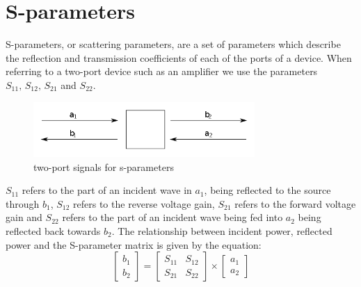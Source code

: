 

\section{S-parameters}

S-parameters, or scattering parameters, are a set of parameters which describe the reflection and transmission coefficients of each of the ports of a device. When referring to a two-port device such as an amplifier we use the parameters $S_{11},\, S_{12},\, S_{21}$ and $S_{22}$.

\begin{figure}[h]
	  \centering
	  \includegraphics[width=0.75\textwidth]{img/S_parameter_image}
	  \caption{two-port signals for s-parameters}
	  \label{fig:fig_sparam_vis}
\end{figure}

 $S_{11}$ refers to the part of an incident wave in $a_1$, being reflected to the source through $b_1$, $S_{12}$ refers to the reverse voltage gain, $S_{21}$ refers to the forward voltage gain and $S_{22}$ refers to the part of an incident wave being fed into $a_2$ being reflected back towards $b_2$.
 The relationship between incident power, reflected power and the S-parameter matrix is given by the equation:
 \begin{equation}
	\begin{bmatrix}
	b_1\\
	b_2
	\end{bmatrix}
	=
	\begin{bmatrix}
	S_{11} & S_{12}\\
	S_{21} & S_{22}
	\end{bmatrix}
	\times
	\begin{bmatrix}
	a_1\\
	a_2
	\end{bmatrix}
 \end{equation}

